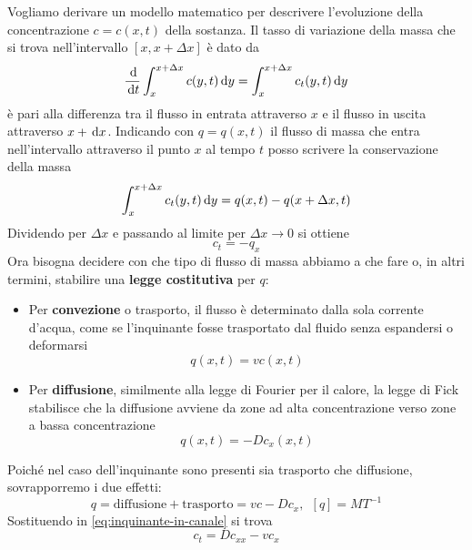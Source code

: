 Vogliamo derivare un modello matematico per descrivere l'evoluzione della concentrazione $\displaystyle c=c(x,t)$ della sostanza. Il tasso di variazione della massa che si trova nell'intervallo $\displaystyle [ x,x+\Delta x]$ è dato da
\begin{equation*}
    \frac{\,\mathrm d}{\,\mathrm d t}\int ^{x+\Delta x}_{x} c(y,t) \,\mathrm d y=\int ^{x+\Delta x}_{x} c_{t}(y,t) \,\mathrm d y
\end{equation*}
è pari alla differenza tra il flusso in entrata attraverso $x$ e il flusso in uscita attraverso $x+\,\mathrm d x$. Indicando con $\displaystyle q=q(x,t)$ il flusso di massa che entra nell'intervallo attraverso il punto $x$ al tempo $t$ posso scrivere la conservazione della massa
\begin{equation*}
    \int ^{x+\Delta x}_{x} c_{t}(y,t) \,\mathrm d y=q(x,t) -q(x+\Delta x,t)
\end{equation*}
Dividendo per $\displaystyle \Delta x$ e passando al limite per $\displaystyle \Delta x\rightarrow 0$ si ottiene
\begin{equation}
    c_{t} =-q_{x}
    \label{eq:inquinante-in-canale}
\end{equation}
Ora bisogna decidere con che tipo di flusso di massa abbiamo a che fare o, in altri termini, stabilire una \textbf{legge costitutiva }per $q$:
\begin{itemize}
    \item Per \textbf{convezione} o trasporto, il flusso è determinato dalla sola corrente d'acqua, come se l'inquinante fosse trasportato dal fluido senza espandersi o deformarsi
          \begin{equation*}
              q(x,t) =vc(x,t)
          \end{equation*}
    \item Per \textbf{diffusione}, similmente alla legge di Fourier per il calore, la legge di Fick stabilisce che la diffusione avviene da zone ad alta concentrazione verso zone a bassa concentrazione
          \begin{equation*}
              q(x,t) =-Dc_{x}(x,t)
          \end{equation*}
\end{itemize}

Poiché nel caso dell'inquinante sono presenti sia trasporto che diffusione, sovrapporremo i due effetti:
\begin{equation*}
    q=\text{diffusione} +\text{trasporto} =vc-Dc_{x},\ \ [ q] =MT^{-1}
\end{equation*}
Sostituendo in \eqref{eq:inquinante-in-canale} si trova
\begin{equation*}
    \boxed{c_{t} =Dc_{xx} -vc_{x}}
\end{equation*}

